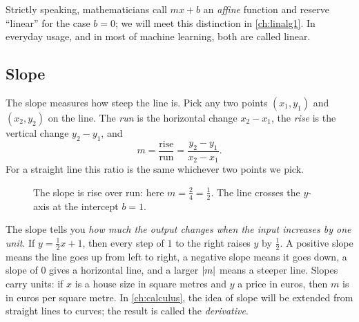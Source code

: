 \begin{remark}
Strictly speaking, mathematicians call $mx + b$ an \emph{affine} function and
reserve ``linear'' for the case $b = 0$; we will meet this distinction in
\cref{ch:linalg1}. In everyday usage, and in most of machine learning, both
are called linear.
\end{remark}

\subsection{Slope}

The slope measures how steep the line is. Pick any two points
$(x_1, y_1)$ and $(x_2, y_2)$ on the line. The \emph{run} is the horizontal
change $x_2 - x_1$, the \emph{rise} is the vertical change $y_2 - y_1$, and
\[
  m = \frac{\text{rise}}{\text{run}} = \frac{y_2 - y_1}{x_2 - x_1} .
\]
For a straight line this ratio is the same whichever two points we pick.

\begin{figure}[htbp]
\centering
{}
\caption{The slope is rise over run: here $m = \tfrac{2}{4} = \tfrac12$. The
  line crosses the $y$-axis at the intercept $b = 1$.}
\label{fig:slope}
\end{figure}

\begin{intuition}
The slope tells you \emph{how much the output changes when the input increases
by one unit}. If $y = \tfrac12x + 1$, then every step of $1$ to the right
raises $y$ by $\tfrac12$. A positive slope means the line goes up from left to
right, a negative slope means it goes down, a slope of $0$ gives a horizontal
line, and a larger $\lvert m\rvert$ means a steeper line. Slopes carry units: if $x$
is a house size in square metres and $y$ a price in euros, then $m$ is in euros
per square metre. In \cref{ch:calculus}, the idea of slope will be extended
from straight lines to curves; the result is called the \emph{derivative}.
\end{intuition}

